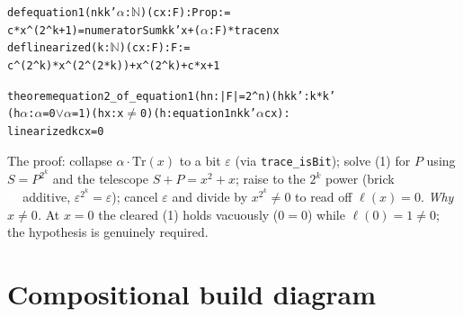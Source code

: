 \documentclass[11pt]{article}
\newenvironment{lean}{\begin{leanbox}\begin{alltt}\small}{\end{alltt}\end{leanbox}}
\newcommand{\bF}{{\colorbox{faceF}{\textcolor{white}{\scriptsize\bfseries F}}}}
\newcommand{\bL}{{\colorbox{faceL}{\textcolor{white}{\scriptsize\bfseries L}}}}
\newcommand{\bT}{{\colorbox{conn}{\textcolor{white}{\scriptsize\bfseries T}}}}
\newcommand{\ck}{\textcolor{grn}{\checkmark}}
\newcommand{\lc}[1]{\texttt{\small #1}}
\begin{document}
\begin{center}
\end{center}
\begin{lean}
def equation1 (n k k' \(\alpha\) : \(\mathbb{N}\)) (c x : F) : Prop :=
  c * x^(2^k+1) = numeratorSum k k' x + (\(\alpha\):F) * trace n x
def linearized (k : \(\mathbb{N}\)) (c x : F) : F :=
  c^(2^k) * x^(2^(2*k)) + x^(2^k) + c*x + 1

theorem equation2_of_equation1 (hn : |F| = 2^n) (hkk' : k*k' %
    (h\(\alpha\) : \(\alpha\)=0 \(\vee\) \(\alpha\)=1) (hx : x \(\neq\) 0) (h : equation1 n k k' \(\alpha\) c x) :
    linearized k c x = 0                                                  \ck
\end{lean}
The proof: collapse $\alpha\cdot\mathrm{Tr}(x)$ to a bit $\varepsilon$ (via
\lc{trace\_isBit}); solve (1) for $P$ using $S=P^{2^k}$ and the telescope
$S+P=x^2+x$; raise to the $2^k$ power (brick \bF\ additive, $\varepsilon^{2^k}=
\varepsilon$); cancel $\varepsilon$ and divide by $x^{2^k}\neq0$ to read off
$\ell(x)=0$.
\emph{Why $x\neq0$.} At $x=0$ the cleared (1) holds vacuously ($0=0$) while
$\ell(0)=1\neq0$; the hypothesis is genuinely required.

\section*{Compositional build diagram}

\begin{center}
\end{center}
\end{document}
